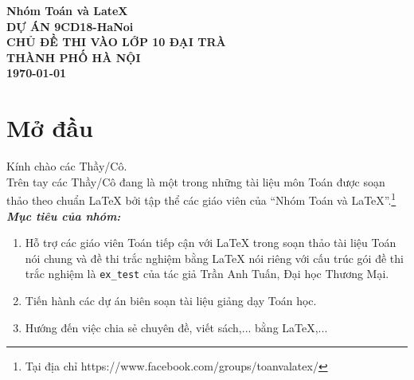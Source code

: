 \documentclass[12pt,a4paper]{book}
\theoremstyle{nonumberplain}
\begin{document}
	\thispagestyle{empty}	
	\begin{tcolorbox}[width=.99\textwidth,height=.99\textheight,arc = 2mm, arc is angular]
		\begin{center}
			{\LARGE \bf \color{red} Nhóm Toán và LateX}\\
			\vspace*{.4cm}
			{\large \bf \color{red} DỰ ÁN 9CD18-HaNoi}\\	
			\vspace*{9cm}	
			{\bf \fontsize{40}{0}\selectfont C\fontsize{20}{0}\selectfont HỦ ĐỀ THI VÀO LỚP 10 ĐẠI TRÀ \\ THÀNH PHỐ HÀ NỘI}\\
			\vspace*{12cm}
			{\large \bf \today}
		\end{center}		
	\end{tcolorbox}
	
	\pagestyle{fancy}
	\chead{\empty}
	\rhead{\currfilename}
	\lfoot{\empty}
	
	\tableofcontents
	
	\chapter*{Mở đầu}
	Kính chào các Thầy/Cô.\\
	\vspace{0.6cm}
	\noindent Trên tay các Thầy/Cô đang là một trong những tài liệu môn Toán được soạn thảo theo chuẩn \LaTeX{} bởi tập thể các giáo viên của ``Nhóm Toán và LaTeX''.\footnote{Tại địa chỉ https://www.facebook.com/groups/toanvalatex/}\\
	\vspace{0.6cm}
	\noindent \textbf{\textit{Mục tiêu của nhóm:}} 
	\begin{enumerate}[\bfseries 1.]
		\item Hỗ trợ các giáo viên Toán tiếp cận với \LaTeX{} trong soạn thảo tài liệu Toán nói chung và đề thi trắc nghiệm bằng \LaTeX{} nói riêng với cấu trúc gói đề thi trắc nghiệm là \texttt{ex\_test} của tác giả Trần Anh Tuấn, Đại học Thương Mại.
		\item Tiến hành các dự án biên soạn tài liệu giảng dạy Toán học.
		\item Hướng đến việc chia sẻ chuyên đề, viết sách,... bằng \LaTeX,...
	\end{enumerate}






	
\end{document}
